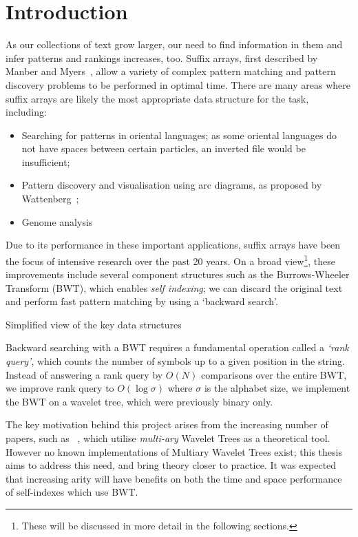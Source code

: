 \section{Introduction}

As our collections of text grow larger, our need to find information in them
and infer patterns and rankings increases, too. Suffix arrays, first
described by Manber and Myers~\cite{manber1990}, allow a variety of complex 
pattern matching and pattern discovery problems to be performed in optimal time. 
There are many areas where suffix arrays are likely the most appropriate data 
structure for the task, including:

\begin{itemize}
\item
	Searching for patterns in oriental languages; as some oriental languages
    do not have spaces between certain particles, an inverted file would be
    insufficient;
\item
	Pattern discovery and visualisation using arc diagrams, as proposed by
    Wattenberg~\cite{arc:wattenberg2002};
\item
	Genome analysis~\cite{genome:abouelhoda2004, genome:flicek2009}
\end{itemize}

Due to its performance in these important applications, suffix arrays have been
the focus of intensive research over the past 20 years. On a broad
view\footnote{These will be discussed in more detail in the following 
sections.}, these improvements include several component structures such as the 
Burrows-Wheeler Transform (BWT), which enables \emph{self indexing}; we can 
discard the original text and perform fast pattern matching by using a `backward 
search'.

			{Simplified view of the key data structures}

Backward searching with a BWT requires a fundamental operation called a 
\emph{`rank query'}, which counts the number of symbols up to a given position in the 
string. Instead of answering a rank query by $O(N)$ comparisons over the
entire BWT, we improve rank query to $O(\log \sigma)$ where $\sigma$ 
is the alphabet size, we implement the BWT on a wavelet tree, which were 
previously binary only. 

The key motivation behind this project arises from the increasing number of
papers, such as ~\cite{yu2009}, which utilise \emph{multi-ary} Wavelet
Trees as a theoretical tool. However no known implementations of Multiary 
Wavelet Trees exist; this thesis aims to address this need, and bring theory 
closer to practice. It was expected that increasing arity will have benefits
on both the time and space performance of self-indexes which use BWT.

